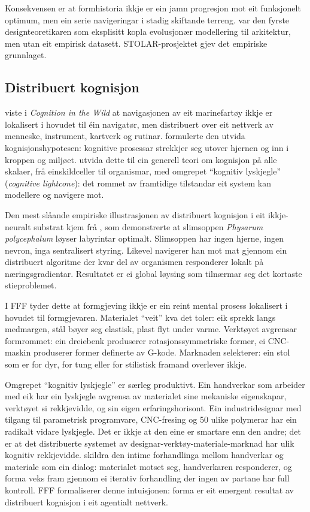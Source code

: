 \documentclass[12pt, a4paper]{article}
\begin{document}
Konsekvensen er at formhistoria ikkje er ein jamn progresjon mot eit funksjonelt optimum, men ein serie navigeringar i stadig skiftande terreng. \citet{frazer1995} var den fyrste designteoretikaren som eksplisitt kopla evolusjonær modellering til arkitektur, men utan eit empirisk datasett. STOLAR-prosjektet gjev det empiriske grunnlaget.

\subsection{Distribuert kognisjon}

\citet{hutchins1995} viste i \textit{Cognition in the Wild} at navigasjonen av eit marinefartøy ikkje er lokalisert i hovudet til éin navigatør, men distribuert over eit nettverk av menneske, instrument, kartverk og rutinar. \citet{clark2008} formulerte den utvida kognisjonshypotesen: kognitive prosessar strekkjer seg utover hjernen og inn i kroppen og miljøet. \citet{levin2019} utvida dette til ein generell teori om kognisjon på alle skalaer, frå einskildceller til organismar, med omgrepet ``kognitiv lyskjegle'' (\textit{cognitive lightcone}): det rommet av framtidige tilstandar eit system kan modellere og navigere mot.

Den mest slåande empiriske illustrasjonen av distribuert kognisjon i eit ikkje-neuralt substrat kjem frå \citet{nakagaki2000}, som demonstrerte at slimsoppen \textit{Physarum polycephalum} løyser labyrintar optimalt. Slimsoppen har ingen hjerne, ingen nevron, inga sentralisert styring. Likevel navigerer han mot mat gjennom ein distribuert algoritme der kvar del av organismen responderer lokalt på næringsgradientar. Resultatet er ei global løysing som tilnærmar seg det kortaste stieproblemet.

I FFF tyder dette at formgjeving ikkje er ein reint mental prosess lokalisert i hovudet til formgjevaren. Materialet ``veit'' kva det toler: eik sprekk langs medmargen, stål bøyer seg elastisk, plast flyt under varme. Verktøyet avgrensar formrommet: ein dreiebenk produserer rotasjonssymmetriske former, ei CNC-maskin produserer former definerte av G-kode. Marknaden selekterer: ein stol som er for dyr, for tung eller for stilistisk framand overlever ikkje.

Omgrepet ``kognitiv lyskjegle'' \citep{levin2019} er særleg produktivt. Ein handverkar som arbeider med eik har ein lyskjegle avgrensa av materialet sine mekaniske eigenskapar, verktøyet si rekkjevidde, og sin eigen erfaringshorisont. Ein industridesignar med tilgang til parametrisk programvare, CNC-fresing og 50 ulike polymerar har ein radikalt vidare lyskjegle. Det er ikkje at den eine er smartare enn den andre; det er at det distribuerte systemet av designar-verktøy-materiale-marknad har ulik kognitiv rekkjevidde. \citet{sennett2008} skildra den intime forhandlinga mellom handverkar og materiale som ein dialog: materialet motset seg, handverkaren responderer, og forma veks fram gjennom ei iterativ forhandling der ingen av partane har full kontroll. FFF formaliserer denne intuisjonen: forma er eit emergent resultat av distribuert kognisjon i eit agentialt nettverk.
\end{document}
